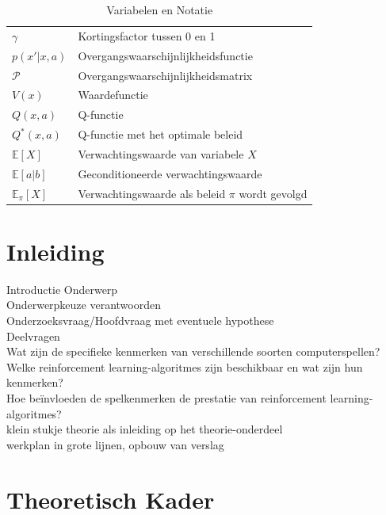 \documentclass[a4paper,12pt]{report}
\begin{document}
\begin{table}[h]
\begin{tabular}{>{\raggedright}p{2.5cm} >{\raggedright\arraybackslash}p{10cm}}
    $\gamma$                 & Kortingsfactor tussen 0 en 1                      \\
    $p(x'|x, a)$             & Overgangswaarschijnlijkheidsfunctie               \\
    $\mathcal{P}$            & Overgangswaarschijnlijkheidsmatrix                \\
    $V(x)$                   & Waardefunctie                                     \\
    $Q(x, a)$                & Q-functie                                         \\
    $Q^*(x, a)$              & Q-functie met het optimale beleid                 \\
    $\mathbb{E}[X]$          & Verwachtingswaarde van variabele $X$              \\
    $\mathbb{E}[a|b]$        & Geconditioneerde verwachtingswaarde               \\
    $\mathbb{E}_{\pi}[X]$    & Verwachtingswaarde als beleid $\pi$ wordt gevolgd \\
  \end{tabular}
  \caption{Variabelen en Notatie}
\end{table}
\newpage

\tableofcontents

\chapter{Inleiding}
Introductie Onderwerp \\ Onderwerpkeuze verantwoorden \\
Onderzoeksvraag/Hoofdvraag met eventuele hypothese \\ Deelvragen \\ Wat zijn de
specifieke kenmerken van verschillende soorten computerspellen? \\ Welke
reinforcement learning-algoritmes zijn beschikbaar en wat zijn hun kenmerken?
\\ Hoe beïnvloeden de spelkenmerken de prestatie van reinforcement
learning-algoritmes? \\ klein stukje theorie als inleiding op het
theorie-onderdeel \\ werkplan in grote lijnen, opbouw van verslag \\

\chapter{Theoretisch Kader}
\end{document}

